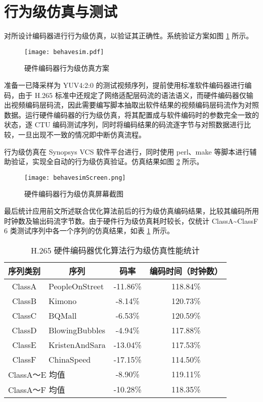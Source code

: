 \section{行为级仿真与测试}
对所设计编码器进行行为级仿真，以验证其正确性。系统验证方案如图 \ref{fig:behavesim} 所示。
\begin{figure}[hbt]
    \centering
    \texttt{[image: behavesim.pdf]}
    \caption{硬件编码器行为级仿真方案}
    \label{fig:behavesim}
\end{figure}
准备一已降采样为 YUV4:2:0 的测试视频序列，提前使用标准软件编码器进行编码，由于 H.265 标准中还规定了网络适配层码流的语法语义，而硬件编码器仅输出视频编码层码流，因此需要编写脚本抽取出软件结果的视频编码层码流作为对照数据。运行硬件编码器的行为级仿真，将其配置成与软件编码时的参数完全一致的状态，逐 CTU 编码测试序列，同时将编码结果的码流逐字节与对照数据进行比较，一旦出现不一致的情况即中断仿真流程。

行为级仿真在 Synopsys VCS 软件平台进行，同时使用 perl、make 等脚本进行辅助验证，实现全自动的行为级仿真验证。仿真结果如图 \ref{fig:behavesimScreen} 所示。
\begin{figure}[hbt]
    \centering
    \texttt{[image: behavesimScreen.png]}
    \caption{硬件编码器行为级仿真屏幕截图}
    \label{fig:behavesimScreen}
\end{figure}

最后统计应用前文所述联合优化算法前后的行为级仿真编码结果，比较其编码所用时钟数及输出码流字节数。由于硬件行为级仿真耗时较长，仅统计 ClassA\textasciitilde ClassF 6 类测试序列中各一个序列的仿真结果，如表 \ref{tab:behavesimTab} 所示。
\begin{table}[hbt]
\centering
\caption{H.265 硬件编码器优化算法行为级仿真性能统计}
\label{tab:behavesimTab}
\begin{tabular}{@{}clcc@{}}
\toprule
序列类别   & \multicolumn{1}{c}{序列} & 码率       & 编码时间（时钟数） \\ \midrule
ClassA & PeopleOnStreet         & -11.86\% & 118.84\%  \\
ClassB & Kimono                 & -8.14\%  & 120.73\%  \\
ClassC & BQMall                 & -6.53\%  & 120.59\%  \\
ClassD & BlowingBubbles         & -4.94\%  & 117.88\%  \\
ClassE & KristenAndSara         & -13.04\% & 117.53\%  \\
ClassF & ChinaSpeed             & -17.15\% & 114.50\%  \\ \midrule
\multicolumn{2}{l}{ClassA～E 均值} & -8.90\%  & 119.11\%  \\ \midrule
\multicolumn{2}{l}{ClassA～F 均值} & -10.28\% & 118.35\%  \\ \bottomrule
\end{tabular}
\end{table}

